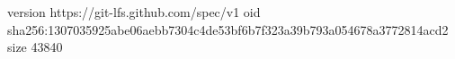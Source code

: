 version https://git-lfs.github.com/spec/v1
oid sha256:1307035925abe06aebb7304c4de53bf6b7f323a39b793a054678a3772814acd2
size 43840

